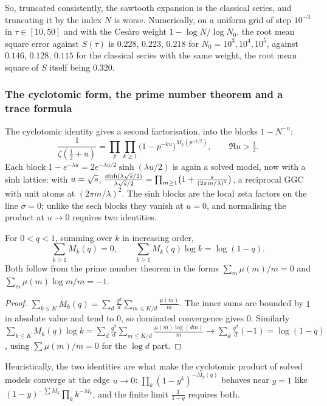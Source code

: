 So, truncated consistently, the sawtooth expansion is the classical series, and truncating it by the index $N$ is worse. Numerically, on a uniform grid of step $10^{-3}$ in $\tau\in[10,50]$ and with the Ces\`aro weight $1-\log N/\log N_0$, the root mean square error against $S(\tau)$ is $0.228$, $0.223$, $0.218$ for $N_0=10^3,10^4,10^5$, against $0.146$, $0.128$, $0.115$ for the classical series with the same weight, the root mean square of $S$ itself being $0.320$.

\subsubsection{The cyclotomic form, the prime number theorem and a trace formula}

The cyclotomic identity gives a second factorisation, into the blocks $1-N^{-u}$:
\[
\frac1{\zeta(\frac12+u)}=\prod_p\prod_{k\ge1}\bigl(1-p^{-ku}\bigr)^{M_k(p^{-1/2})},\qquad\Re u>\tfrac12 .
\]
Each block $1-e^{-\lambda u}=2e^{-\lambda u/2}\sinh(\lambda u/2)$ is again a solved model, now with a sinh lattice: with $u=\sqrt{s}$, $\frac{\sinh(\lambda\sqrt{s}/2)}{\lambda\sqrt{s}/2}=\prod_{m\ge1}\bigl(1+\frac{s}{(2\pi m/\lambda)^2}\bigr)$, a reciprocal GGC with unit atoms at $(2\pi m/\lambda)^2$. The sinh blocks are the local zeta factors on the line $\sigma=0$; unlike the sech blocks they vanish at $u=0$, and normalising the product at $u\to0$ requires two identities.

\begin{proposition}\label{rz:prop:pnt}
For $0<q<1$, summing over $k$ in increasing order,
\[
\sum_{k\ge1}M_k(q)=0,\qquad\sum_{k\ge1}M_k(q)\log k=\log(1-q).
\]
Both follow from the prime number theorem in the forms $\sum_m\mu(m)/m=0$ and $\sum_m\mu(m)\log m/m=-1$.
\end{proposition}

\begin{proof}
$\sum_{k\le K}M_k(q)=\sum_d\frac{q^d}d\sum_{m\le K/d}\frac{\mu(m)}m$. The inner sums are bounded by $1$ in absolute value and tend to $0$, so dominated convergence gives $0$. Similarly $\sum_{k\le K}M_k(q)\log k=\sum_d\frac{q^d}d\sum_{m\le K/d}\frac{\mu(m)\log(dm)}m\to\sum_d\frac{q^d}d(-1)=\log(1-q)$, using $\sum\mu(m)/m=0$ for the $\log d$ part.
\end{proof}

Heuristically, the two identities are what make the cyclotomic product of solved models converge at the edge $u\to0$: $\prod_k(1-y^k)^{-M_k(q)}$ behaves near $y=1$ like $(1-y)^{-\sum M_k}\prod_kk^{-M_k}$, and the finite limit $\frac1{1-q}$ requires both.


